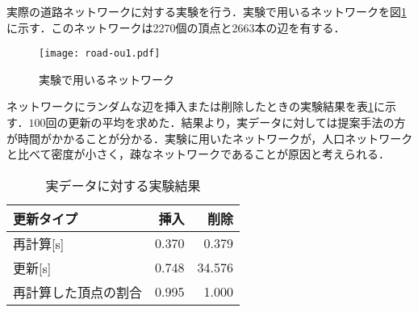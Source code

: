 実際の道路ネットワークに対する実験を行う．実験で用いるネットワークを図\ref{fig:net-ou1}に示す．このネットワークは2270個の頂点と2663本の辺を有する．
\begin{figure}[tb]
  \centering
  \texttt{[image: road-ou1.pdf]}
  \caption{実験で用いるネットワーク}
  \label{fig:net-ou1}
\end{figure}

ネットワークにランダムな辺を挿入または削除したときの実験結果を表\ref{tab:res-ou1}に示す．$100$回の更新の平均を求めた．結果より，実データに対しては提案手法の方が時間がかかることが分かる．実験に用いたネットワークが，人口ネットワークと比べて密度が小さく，疎なネットワークであることが原因と考えられる．

\begin{table}[tb]
  \centering
  \caption{実データに対する実験結果}
  \label{tab:res-ou1}
  \begin{tabular}{lrr}
    \hline\hline
    更新タイプ & 挿入 & 削除 \\ \hline\hline
    再計算[s] & 0.370 & 0.379 \\ \hline
    更新[s] & 0.748 & 34.576 \\ \hline\hline
    再計算した頂点の割合 & 0.995 & 1.000 \\ \hline\hline
  \end{tabular}
\end{table}
